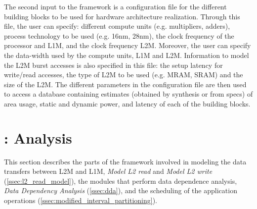\label{ssec:conf_param}
The second input to the framework is a configuration file for the different building blocks to be used for hardware architecture realization. Through this file, the user can specify: different compute units (e.g. multipliers, adders), process technology to be used (e.g. 16nm, 28nm), the clock frequency of the processor and L1M, and the clock frequency L2M. Moreover, the user can specify the data-width used by the compute units, L1M and L2M.
Information to model the L2M burst accesses is also specified in this file: the setup latency for write/read accesses, the type of L2M to be used (e.g. MRAM, SRAM) and the size of the L2M. The different parameters in the configuration file are then used to access a database containing estimates (obtained by synthesis or from specs) of area usage, static and dynamic power, and latency of each of the building blocks. %

%

\section{\frameworkname: Analysis}
This section describes the parts of the framework involved in modeling the data transfers between L2M and L1M, \textit{Model L2 read} and \textit{Model L2 write} (\ref{ssec:l2_read_model}), the modules that perform data dependence analysis, \textit{Data Dependency Analysis} (\ref{ssec:dda}), and the scheduling of the application operations (\ref{ssec:modified_interval_partitioning}).
\vspace{-1mm}
